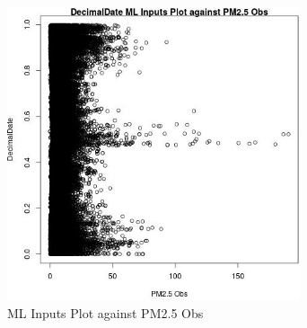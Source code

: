 \begin{figure} 
\centering  
\includegraphics[width=0.77\textwidth]{Code_Outputs/Report_ML_input_PM25_Step4_part_e_de_duplicated_aves_DecimalDatevPM25_Obs.jpg} 
\caption{\label{fig:Report_ML_input_PM25_Step4_part_e_de_duplicated_avesDecimalDatevPM25_Obs}ML Inputs Plot against PM2.5 Obs} 
\end{figure} 
 
